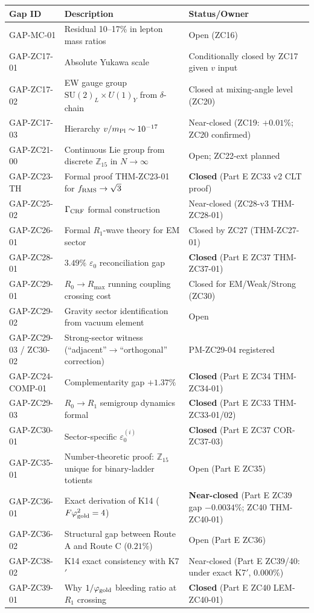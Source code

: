 \documentclass[11pt, a4paper]{article}
\newcommand{\phig}{\varphi_{\rm gold}}
\begin{document}
\begin{longtable}{p{3.5cm} p{5.5cm} p{4cm}}
\toprule
Gap ID & Description & Status/Owner \\
\midrule
\endhead
GAP-MC-01   & Residual 10--17\% in lepton mass ratios & Open (ZC16) \\
GAP-ZC17-01 & Absolute Yukawa scale & Conditionally closed by ZC17 given $v$ input \\
GAP-ZC17-02 & EW gauge group $\mathrm{SU}(2)_L\times U(1)_Y$ from $\delta$-chain & Closed at mixing-angle level (ZC20) \\
GAP-ZC17-03 & Hierarchy $v/m_{\rm Pl}\sim 10^{-17}$ & Near-closed (ZC19: $+0.01\%$; ZC20 confirmed) \\
GAP-ZC21-00 & Continuous Lie group from discrete $\mathbb{Z}_{15}$ in $N\to\infty$ & Open; ZC22-ext planned \\
GAP-ZC23-TH & Formal proof THM-ZC23-01 for $f_{\rm RMS}\to\sqrt{3}$ & \textbf{Closed} (Part E ZC33 v2 CLT proof) \\
GAP-ZC25-02 & $\Gamma_{\rm CRF}$ formal construction & Near-closed (ZC28-v3 THM-ZC28-01) \\
GAP-ZC26-01 & Formal $R_1$-wave theory for EM sector & Closed by ZC27 (THM-ZC27-01) \\
GAP-ZC28-01 & $3.49\%$ $\varepsilon_0$ reconciliation gap & \textbf{Closed} (Part E ZC37 THM-ZC37-01) \\
GAP-ZC29-01 & $R_0\to R_{\max}$ running coupling crossing cost & Closed for EM/Weak/Strong (ZC30) \\
GAP-ZC29-02 & Gravity sector identification from vacuum element & Open \\
GAP-ZC29-03 / ZC30-02 & Strong-sector witness (``adjacent''$\to$``orthogonal'' correction) & PM-ZC29-04 registered \\
GAP-ZC24-COMP-01 & Complementarity gap $+1.37\%$ & \textbf{Closed} (Part E ZC34 THM-ZC34-01) \\
GAP-ZC29-03 & $R_0 \to R_1$ semigroup dynamics formal & \textbf{Closed} (Part E ZC33 THM-ZC33-01/02) \\
GAP-ZC30-01 & Sector-specific $\varepsilon_0^{(i)}$ & \textbf{Closed} (Part E ZC37 COR-ZC37-03) \\
GAP-ZC35-01 & Number-theoretic proof: $\mathbb{Z}_{15}$ unique for binary-ladder totients & Open (Part E ZC35) \\
GAP-ZC36-01 & Exact derivation of K14 ($F\phig^2 = 4$) & \textbf{Near-closed} (Part E ZC39 gap $-0.0034\%$; ZC40 THM-ZC40-01) \\
GAP-ZC36-02 & Structural gap between Route A and Route C ($0.21\%$) & Open (Part E ZC36) \\
GAP-ZC38-02 & K14 exact consistency with K7$'$ & Near-closed (Part E ZC39/40: under exact K7$'$, $0.000\%$) \\
GAP-ZC39-01 & Why $1/\phig$ bleeding ratio at $R_1$ crossing & \textbf{Closed} (Part E ZC40 LEM-ZC40-01) \\
\bottomrule
\end{longtable}
\end{document}
